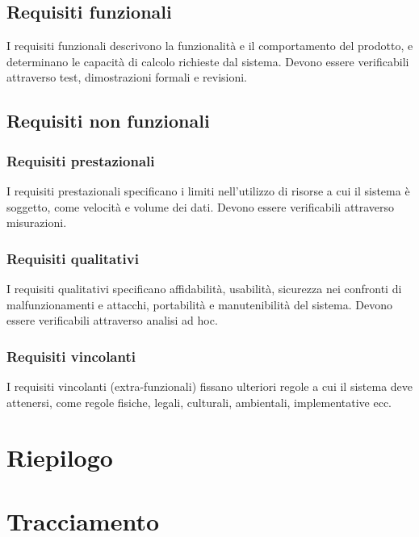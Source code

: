 \documentclass[a4paper, titlepage]{article}
\begin{document}
\subsection{Requisiti funzionali}
I requisiti funzionali descrivono la funzionalità e il comportamento del prodotto, e determinano le capacità di calcolo richieste dal sistema. Devono essere verificabili attraverso test, dimostrazioni formali e revisioni.



\subsection{Requisiti non funzionali}
\subsubsection{Requisiti prestazionali}
I requisiti prestazionali specificano i limiti nell'utilizzo di risorse a cui il sistema è soggetto, come velocità e volume dei dati. Devono essere verificabili attraverso misurazioni.



\subsubsection{Requisiti qualitativi}
I requisiti qualitativi specificano affidabilità, usabilità, sicurezza nei confronti di malfunzionamenti e attacchi, portabilità e manutenibilità del sistema. Devono essere verificabili attraverso analisi ad hoc.



\subsubsection{Requisiti vincolanti}
I requisiti vincolanti (extra-funzionali) fissano ulteriori regole a cui il sistema deve attenersi, come regole fisiche, legali, culturali, ambientali, implementative ecc.



\newpage
\section{Riepilogo}



\section{Tracciamento}
\end{document}
